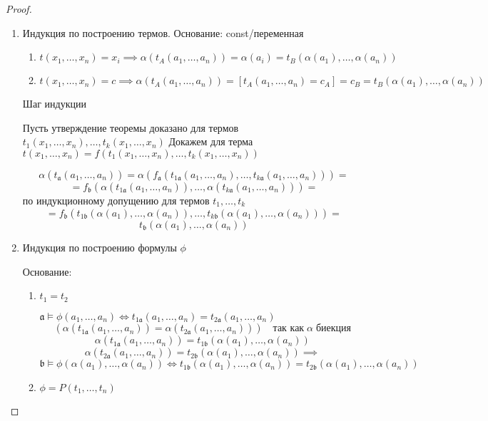 \documentclass[a4paper]{article}
\theoremstyle{definition}
\theoremstyle{remark}
\begin{document}
    \begin{proof}
        \begin{enumerate}
            \item
            Индукция по построению термов. Основание: const/переменная

        \begin{enumerate}
            \item $t(x_1, \dots, x_n) = x_i\implies \alpha (t_A(a_1, \dots, a_n)) = \alpha(a_i) = t_B (\alpha(a_1), \dots, \alpha(a_n))$
            \item $t(x_1, \dots, x_n) = c \implies \alpha(t_A(a_1, \dots, a_n))= [t_A(a_1, \dots, a_n) = c_A] = c_B = t_B(\alpha(a_1), \dots, \alpha(a_n))$
        \end{enumerate}

        Шаг индукции

        Пусть утверждение теоремы доказано для термов $t_1(x_1, \dots, x_n), \dots, t_k (x_1, \dots, x_n)$
        Докажем для терма $t(x_1, \dots, x_n) = f(t_1(x_1, \dots, x_n), \dots, t_k(x_1, \dots, x_n))$

        $$\alpha (t_\mathfrak{a}(a_1, \dots, a_n)) = \alpha (f_\mathfrak{a}(t_{1\mathfrak{a}}(a_1, \dots, a_n), \dots, t_{k\mathfrak{a}}(a_1, \dots, a_n)))=$$
        $$=f_\mathfrak{b}(\alpha(t_{1\mathfrak{a}}(a_1, \dots, a_n)), \dots, \alpha(t_{k\mathfrak{a}}(a_1, \dots, a_n)))=$$
        по индукционному допущению для термов $t_1, \dots, t_k$
        $$=f_\mathfrak{b}(t_{1\mathfrak{b}}(\alpha(a_1), \dots, \alpha(a_n)), \dots, t_{k\mathfrak{b}}(\alpha(a_1), \dots, \alpha(a_n)))=$$
        $$t_\mathfrak{b}(\alpha(a_1), \dots, \alpha(a_n))$$
            \item 
            Индукция по построению формулы $\phi$

            Основание: 
            \begin{enumerate}
                \item $t_1 = t_2$

                $\mathfrak{a} \models \phi(a_1, \dots, a_n)\Leftrightarrow t_{1\mathfrak{a}}(a_1, \dots, a_n) = t_{2\mathfrak{a}}(a_1, \dots, a_n) $
                $$(\alpha(t_{1\mathfrak{a}}(a_1, \dots, a_n)) = \alpha(t_{2\mathfrak{a}}(a_1, \dots, a_n)))\quad\text{так как}\;\alpha\;\text{биекция}$$
                $$\alpha(t_{1\mathfrak{a}}(a_1, \dots, a_n)) = t_{1\mathfrak{b}}(\alpha(a_1), \dots, \alpha(a_n))$$
                $$\alpha(t_{2\mathfrak{a}}(a_1, \dots, a_n)) = t_{2\mathfrak{b}}(\alpha(a_1), \dots, \alpha(a_n))\implies$$
                $\mathfrak{b}\models \phi(\alpha(a_1), \dots, \alpha(a_n)) \Leftrightarrow t_{1\mathfrak{b}}(\alpha(a_1), \dots, \alpha(a_n)) = t_{2\mathfrak{b}}(\alpha(a_1), \dots, \alpha(a_n))$
                \item $\phi = P(t_1, \dots, t_n)$


\end{enumerate}
\end{enumerate}
\end{proof}
\end{document}
